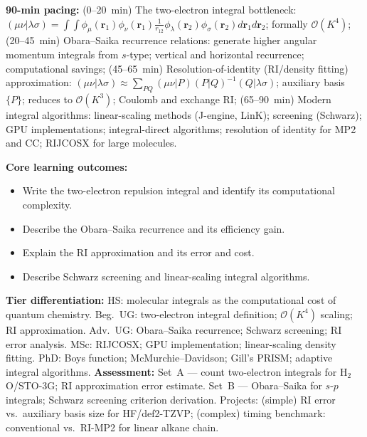 \documentclass[11pt,a4paper]{article}
\begin{document}
\begin{tcolorbox}[chembox, title={Module~III.2 --- Lecture L15: Molecular Integral Schemes}]
\textbf{90-min pacing:} (0--20~min) The two-electron integral bottleneck: $(\mu\nu|\lambda\sigma)=\int\int\phi_\mu(\mathbf{r}_1)\phi_\nu(\mathbf{r}_1)\tfrac{1}{r_{12}}\phi_\lambda(\mathbf{r}_2)\phi_\sigma(\mathbf{r}_2)d\mathbf{r}_1d\mathbf{r}_2$; formally $\mathcal{O}(K^4)$; (20--45~min) Obara--Saika recurrence relations: generate higher angular momentum integrals from $s$-type; vertical and horizontal recurrence; computational savings; (45--65~min) Resolution-of-identity (RI/density fitting) approximation: $(\mu\nu|\lambda\sigma)\approx\sum_{PQ}(\mu\nu|P)(P|Q)^{-1}(Q|\lambda\sigma)$; auxiliary basis $\{P\}$; reduces to $\mathcal{O}(K^3)$; Coulomb and exchange RI; (65--90~min) Modern integral algorithms: linear-scaling methods (J-engine, LinK); screening (Schwarz); GPU implementations; integral-direct algorithms; resolution of identity for MP2 and CC; RIJCOSX for large molecules.

\medskip\textbf{Core learning outcomes:}
\begin{itemize}[leftmargin=1.4em,topsep=2pt,itemsep=1pt]
  \item Write the two-electron repulsion integral and identify its computational complexity.
  \item Describe the Obara--Saika recurrence and its efficiency gain.
  \item Explain the RI approximation and its error and cost.
  \item Describe Schwarz screening and linear-scaling integral algorithms.
\end{itemize}
\medskip\textbf{Tier differentiation:}
HS: molecular integrals as the computational cost of quantum chemistry.
Beg.\ UG: two-electron integral definition; $\mathcal{O}(K^4)$ scaling; RI approximation.
Adv.\ UG: Obara--Saika recurrence; Schwarz screening; RI error analysis.
MSc: RIJCOSX; GPU implementation; linear-scaling density fitting.
PhD: Boys function; McMurchie--Davidson; Gill's PRISM; adaptive integral algorithms.
\medskip\textbf{Assessment:}
Set~A --- count two-electron integrals for H$_2$O/STO-3G; RI approximation error estimate.
Set~B --- Obara--Saika for $s$-$p$ integrals; Schwarz screening criterion derivation.
Projects: (simple) RI error vs.\ auxiliary basis size for HF/def2-TZVP; (complex) timing benchmark: conventional vs.\ RI-MP2 for linear alkane chain.
\end{tcolorbox}

\medskip
\end{document}
